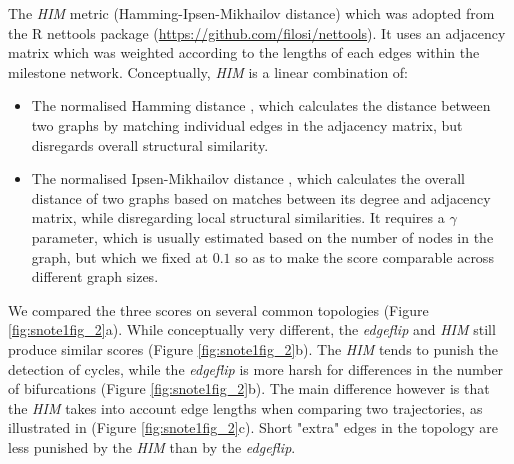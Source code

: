 The \textit{HIM} metric (Hamming-Ipsen-Mikhailov distance) \cite{jurman_himglocalmetric_2015} which was adopted from the R nettools package (\href{https://github.com/filosi/nettools}{https://github.com/filosi/nettools}). It uses an adjacency matrix which was weighted according to the lengths of each edges within the milestone network. Conceptually, \textit{HIM} is a linear combination of:

\begin{itemize}
	\item The normalised Hamming distance \cite{dougherty_validationgeneregulatory_2011}, which calculates the distance between two graphs by matching individual edges in the adjacency matrix, but disregards overall structural similarity.
	\item The normalised Ipsen-Mikhailov distance \cite{ipsen_evolutionaryreconstructionnetworks_2002}, which calculates the overall distance of two graphs based on matches between its degree and adjacency matrix, while disregarding local structural similarities. It requires a $\gamma$ parameter, which is usually estimated based on the number of nodes in the graph, but which we fixed at $0.1$ so as to make the score comparable across different graph sizes.
\end{itemize}

We compared the three scores on several common topologies (Figure \ref{fig:snote1fig_2}a). While conceptually very different, the \textit{edgeflip} and \textit{HIM} still produce similar scores (Figure \ref{fig:snote1fig_2}b). The \textit{HIM} tends to punish the detection of cycles, while the \textit{edgeflip} is more harsh for differences in the number of bifurcations (Figure \ref{fig:snote1fig_2}b). The main difference however is that the \textit{HIM} takes into account edge lengths when comparing two trajectories, as illustrated in (Figure \ref{fig:snote1fig_2}c). Short "extra" edges in the topology are less punished by the \textit{HIM} than by the \textit{edgeflip}.


